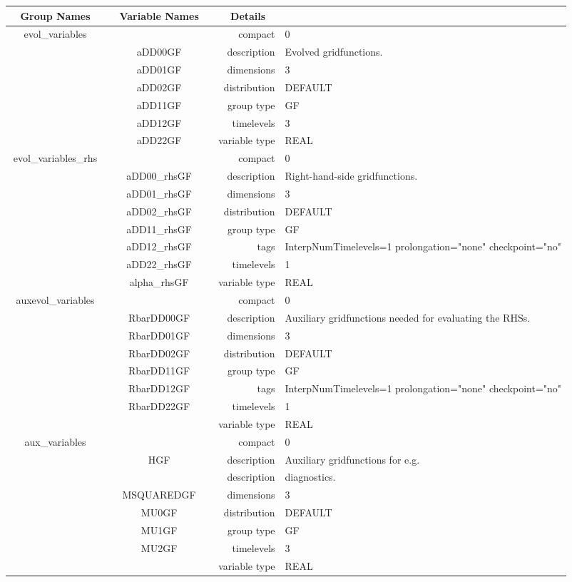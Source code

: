\begin{tabular*}{150mm}{|c|c@{\extracolsep{\fill}}|rl|} \hline 
~ {\bf Group Names} ~ & ~ {\bf Variable Names} ~  &{\bf Details} ~ & ~\\ 
\hline 
evol\_variables &  & compact & 0 \\ 
 & aDD00GF & description & Evolved gridfunctions. \\ 
 & aDD01GF & dimensions & 3 \\ 
 & aDD02GF & distribution & DEFAULT \\ 
 & aDD11GF & group type & GF \\ 
 & aDD12GF & timelevels & 3 \\ 
 & aDD22GF & variable type & REAL \\ 
\hline 
evol\_variables\_rhs &  & compact & 0 \\ 
 & aDD00\_rhsGF & description & Right-hand-side gridfunctions. \\ 
 & aDD01\_rhsGF & dimensions & 3 \\ 
 & aDD02\_rhsGF & distribution & DEFAULT \\ 
 & aDD11\_rhsGF & group type & GF \\ 
 & aDD12\_rhsGF & tags & InterpNumTimelevels=1 prolongation="none" checkpoint="no" \\ 
 & aDD22\_rhsGF & timelevels & 1 \\ 
 & alpha\_rhsGF & variable type & REAL \\ 
\hline 
auxevol\_variables &  & compact & 0 \\ 
 & RbarDD00GF & description & Auxiliary gridfunctions needed for evaluating the RHSs. \\ 
 & RbarDD01GF & dimensions & 3 \\ 
 & RbarDD02GF & distribution & DEFAULT \\ 
 & RbarDD11GF & group type & GF \\ 
 & RbarDD12GF & tags & InterpNumTimelevels=1 prolongation="none" checkpoint="no" \\ 
 & RbarDD22GF & timelevels & 1 \\ 
 &  & variable type & REAL \\ 
\hline 
aux\_variables &  & compact & 0 \\ 
 & HGF & description & Auxiliary gridfunctions for e.g. \\ 
& ~ & description &  diagnostics. \\ 
 & MSQUAREDGF & dimensions & 3 \\ 
 & MU0GF & distribution & DEFAULT \\ 
 & MU1GF & group type & GF \\ 
 & MU2GF & timelevels & 3 \\ 
 &  & variable type & REAL \\ 
\hline 
\end{tabular*} 



